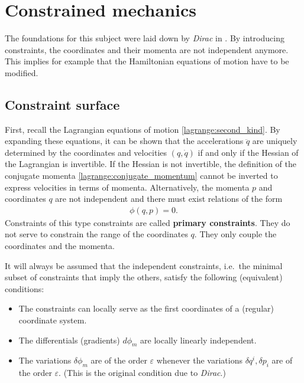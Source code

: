 \chapter{Constrained mechanics}\label{chapter:constrained_dynamics}

    The foundations for this subject were laid down by \textit{Dirac} in \cite{constrained}. By introducing constraints, the coordinates and their momenta are not independent anymore. This implies for example that the Hamiltonian equations of motion have to be modified.

\section{Constraint surface}

    First, recall the Lagrangian equations of motion \eqref{lagrange:second_kind}. By expanding these equations, it can be shown that the accelerations $\ddot{q}$ are uniquely determined by the coordinates and velocities $(q,\dot{q})$ if and only if the Hessian of the Lagrangian is invertible. If the Hessian is not invertible, the definition of the conjugate momenta \ref{lagrange:conjugate_momentum} cannot be inverted to express velocities in terms of momenta. Alternatively, the momenta $p$ and coordinates $q$ are not independent and there must exist relations of the form
    \begin{gather}
        \phi(q,p) = 0.
    \end{gather}
    Constraints of this type constraints are called \textbf{primary constraints}. They do not serve to constrain the range of the coordinates $q$. They only couple the coordinates and the momenta.

    \begin{axiom}
        It will always be assumed that the independent constraints, i.e.~the minimal subset of constraints that imply the others, satisfy the following (equivalent) conditions:
        \begin{itemize}
            \item The constraints can locally serve as the first coordinates of a (regular) coordinate system.
            \item The differentials (gradients) $d\phi_m$ are locally linearly independent.
            \item The variations $\delta\phi_m$ are of the order $\varepsilon$ whenever the variations $\delta q^i,\delta p_i$ are of the order $\varepsilon$. (This is the original condition due to \textit{Dirac}.)
        \end{itemize}
    \end{axiom}

